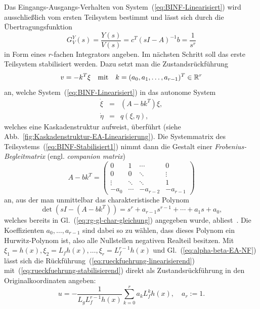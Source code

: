 Das Eingangs-Ausgangs-Verhalten von System~(\ref{eq:BINF-Linearisiert})
wird ausschließlich vom ersten Teilsystem bestimmt und lässt sich
durch die Übertragungsfunktion
\[
G_{V}^{Y}(s)=\frac{Y(s)}{V(s)}=c^{T}(sI-A)^{-1}b=\frac{1}{s^{r}}
\]
in Form eines $r$-fachen Integrators angeben. Im nächsten Schritt
soll das erste Teilsystem stabilisiert werden. Dazu setzt man die
Zustandsrückführung 
\begin{equation}
v=-k^{T}\xi\quad\text{mit}\quad k=(a_{0},a_{1},\ldots,a_{r-1})^{T}\in{\mathbb{R}}^{r}\label{eq:rueckfuehrung-stabilisierend}
\end{equation}
an, welche System~(\ref{eq:BINF-Linearisiert}) in das autonome System\begin{subequations}\label{eq:BINF-Stabilisiert}
\begin{eqnarray}
\dot{\xi} & = & \left(A-bk^{T}\right)\xi,\label{eq:BINF-Stabilisiert1}\\
\dot{\eta} & = & q(\xi,\eta),\label{eq:BINF-Stabilisiert2}
\end{eqnarray}
\end{subequations}welches eine Kaskadenstruktur aufweist, überführt
(siehe Abb.~\ref{fig:Kaskadenstruktur-EA-Linearisierung}). Die System\-matrix
des Teilsystems~(\ref{eq:BINF-Stabilisiert1}) nimmt dann die Gestalt
einer \emph{Frobenius-Begleitmatrix}
(engl. \emph{companion matrix})
\begin{equation}
A-bk^{T}=\left(\begin{array}{cccc}
0 & 1 & \cdots & 0\\
0 & 0 & \ddots & \vdots\\
\vdots & \ddots & \ddots & 1\\
-a_{0} & \cdots & -a_{r-2} & -a_{r-1}
\end{array}\right)\label{eq:TS1-Matrix-geschlossener-Kreis}
\end{equation}
an, aus der man unmittelbar das charakteristische Polynom 
\begin{equation}
\det\left(sI-(A-bk^{T})\right)=s^{r}+a_{r-1}s^{r-1}+\cdots+a_{1}s+a_{0},\label{eq:TS1-charakteristisches-Polynom}
\end{equation}
welches bereits in Gl.~(\ref{eq:rg-gl-char-gleichung}) angegeben
wurde, abliest~\cite{gantmacher86}. Die Koeffizienten $a_{0},\ldots,a_{r-1}$
sind dabei so zu wählen, dass dieses Polynom ein Hurwitz-Polynom ist,
also alle Nullstellen negativen Realteil besitzen. Mit $\xi_{1}=h(x),\xi_{2}=L_{f}h(x),\ldots,\xi_{r}=L_{f}^{r-1}h(x)$
und Gl.~(\ref{eq:alpha-beta-EA-NF}) lässt sich die Rückführung~(\ref{eq:rueckfuehrung-linearisierend})
mit~(\ref{eq:rueckfuehrung-stabilisierend}) direkt als Zustandsrückführung
in den Originalkoordinaten angeben: 
\begin{equation}
u=-\frac{1}{L_{g}L_{f}^{r-1}h(x)}\sum_{k=0}^{r}a_{k}L_{f}^{k}h(x),\quad a_{r}:=1.\label{eq:rueckfuehrung-stabilisierend-x}
\end{equation}

